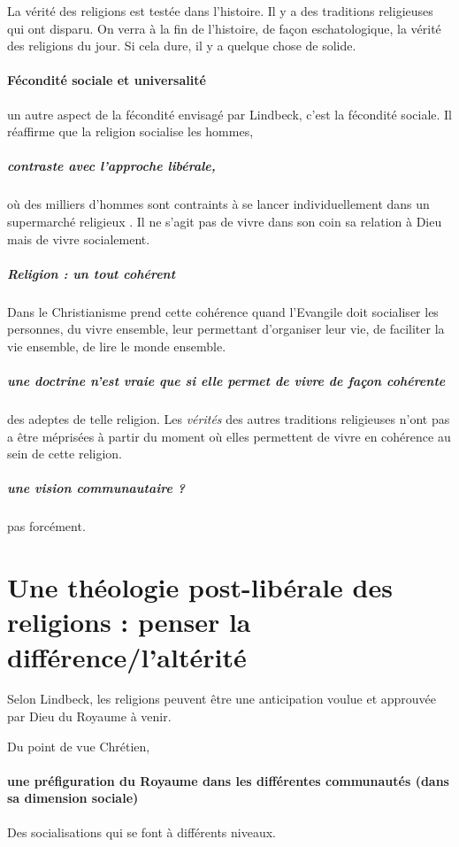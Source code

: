 La vérité des religions est testée dans l'histoire. Il y a des traditions religieuses qui ont disparu. On verra à la fin de l'histoire, de façon eschatologique, la vérité des religions du jour. Si cela dure, il y a quelque chose de solide. 

  \paragraph{Fécondité sociale et universalité} 
  
  un autre aspect de la fécondité envisagé par Lindbeck, c'est la fécondité sociale.  Il réaffirme que la religion socialise les hommes, 
  
  \subparagraph{contraste avec l'approche libérale,} où des milliers d'hommes sont contraints à se lancer individuellement dans un supermarché religieux . Il ne s'agit pas de vivre dans son coin sa relation à Dieu mais de vivre socialement. 
  
  \subparagraph{Religion : un tout cohérent} Dans le Christianisme prend cette cohérence quand l'Evangile doit socialiser les personnes, du vivre ensemble, leur permettant d'organiser leur vie, de faciliter la vie ensemble, de lire le monde ensemble. 
  
  \subparagraph{une doctrine n'est vraie que si elle permet de vivre de façon cohérente} des adeptes de telle religion. Les \textit{vérités} des autres traditions religieuses n'ont pas a être méprisées à partir du moment où elles permettent de vivre en cohérence au sein de cette religion.
  
  \subparagraph{une vision communautaire ?} pas forcément.
  
  
  
  
  
  \section{Une théologie post-libérale des religions : penser la différence/l’altérité}
    
 Selon Lindbeck, les religions peuvent être une anticipation voulue et approuvée par Dieu du Royaume à venir.
 
 Du point de vue Chrétien, \paragraph{une préfiguration du Royaume dans les différentes communautés (dans sa dimension sociale)} Des socialisations qui se font à différents niveaux. 
    
